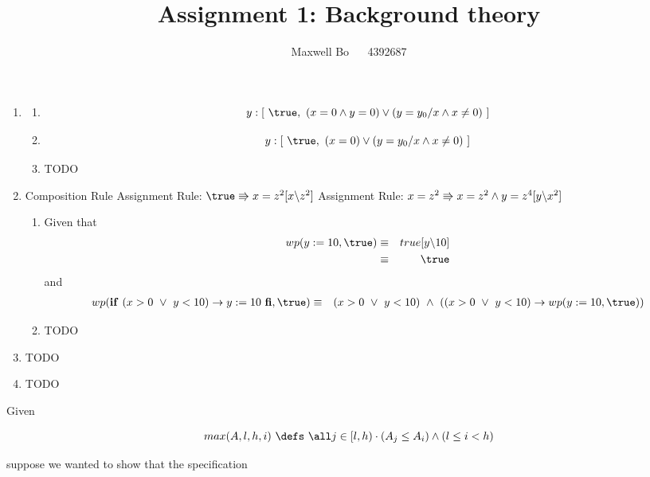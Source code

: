 \documentclass{article}
\title{\bf Assignment 1: Background theory}
\author{Maxwell Bo  ~~ 4392687}
\begin{document}
\maketitle

\begin{enumerate}
    \item 
    \begin{enumerate}
        \item \[ y: [~\true, ~(x = 0 \land y = 0) \lor (y = y_0 / x \land x \neq 0)~]\]
        \item \[ y: [~\true, ~(x = 0) \lor (y = y_0 / x \land x \neq 0)~]\]
        \item TODO
    \end{enumerate}
    \item 
        \DERIVE
         {Composition Rule}
         {Assignment Rule: $\true \entails x = z^2 [x \backslash z^2]$}
         {Assignment Rule: $x = z^2 \Rrightarrow x = z^2 \land y = z ^ 4[y \backslash x^2]$}
        \ENDDERIVE
    \begin{enumerate}
        \item Given that
        \begin{eqnarray*}
            wp(y := 10, \true) & \equiv & true[y \backslash 10]\\
                               & \equiv & \true
        \end{eqnarray*} and 
        \begin{eqnarray*}
            wp(\If~ (x > 0 ~\lor~ y < 10) \rightarrow y:= 10 ~\Fi, \true) & \equiv & ( x > 0 ~\lor~ y < 10) ~\land~ ((x > 0 ~\lor~ y < 10) \rightarrow wp(y := 10, \true)) 
        \end{eqnarray*}
        \item TODO
    \end{enumerate}
    \item TODO
    \item TODO
\end{enumerate}

Given 

\[max(A,l,h,i) ~\defs~ \all j \in [l,h) \cdot (A_j \leq A_i) \land (l \leq i < h)\]   %

suppose we wanted to show that the specification
\end{document}

